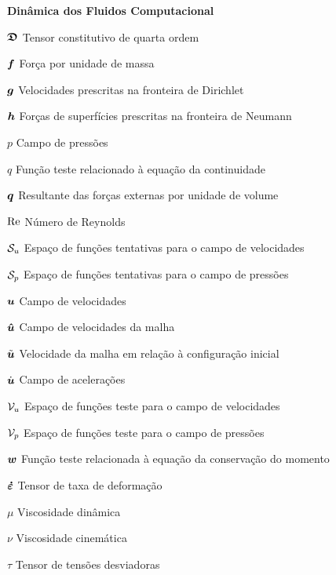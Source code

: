 \begin{simbolos}
  \item[\textbf{Dinâmica dos Fluidos Computacional}]
  \item[$\boldsymbol{\mathfrak{D}}$] Tensor constitutivo de quarta ordem
  \item[$\boldsymbol{f}$] Força por unidade de massa
  \item[$\boldsymbol{g}$] Velocidades prescritas na fronteira de Dirichlet
  \item[$\boldsymbol{h}$] Forças de superfícies prescritas na fronteira de Neumann
  \item[$p$] Campo de pressões
  \item[$q$] Função teste relacionado à equação da continuidade
  \item[$\boldsymbol{q}$] Resultante das forças externas por unidade de volume
  \item[$\mathrm{Re}$] Número de Reynolds
  \item[$\mathcal{S}_u$] Espaço de funções tentativas para o campo de velocidades
  \item[$\mathcal{S}_p$] Espaço de funções tentativas para o campo de pressões
  \item[$\boldsymbol{u}$] Campo de velocidades
  \item[$\boldsymbol{\hat{u}}$] Campo de velocidades da malha
  \item[$\tilde{\boldsymbol{u}}$] Velocidade da malha em relação à configuração inicial
  \item[$\dot{\boldsymbol{u}}$] Campo de acelerações
  \item[$\mathcal{V}_u$] Espaço de funções teste para o campo de velocidades
  \item[$\mathcal{V}_p$] Espaço de funções teste para o campo de pressões
  \item[$\boldsymbol{w}$] Função teste relacionada à equação da conservação do momento
  \item[$\boldsymbol{\dot{\varepsilon}}$] Tensor de taxa de deformação
  \item[$\mu$] Viscosidade dinâmica
  \item[$\nu$] Viscosidade cinemática
  \item[$\tau$] Tensor de tensões desviadoras


\end{simbolos}
